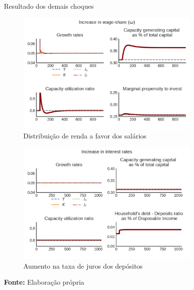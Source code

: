 \begin{figure}[htb]
     \centering
     \caption{Resultado dos demais choques}
     \begin{subfigure}[b]{0.45\textwidth}
         \centering
        \caption{Distribuição de renda a favor dos salários}
        \label{choque_2}
        \includegraphics[width = 1\textwidth]{Modelo/Shock_2.png}
     \end{subfigure}
     \hfill
     \begin{subfigure}[b]{0.45\textwidth}
         \centering
         \caption{Aumento na taxa de juros dos depósitos}
         \label{choque_3}
         \includegraphics[width = 1\textwidth]{Modelo/Shock_3.png}
     \end{subfigure}
        \caption*{\textbf{Fonte:} Elaboração própria}
        \label{choques}
\end{figure}


